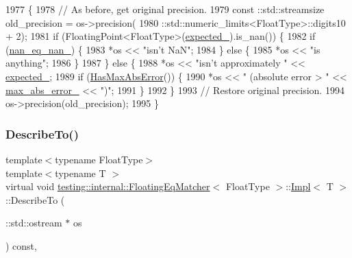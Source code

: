 \begin{DoxyCode}
1977                                                           \{
1978       \textcolor{comment}{// As before, get original precision.}
1979       const ::std::streamsize old\_precision = os->precision(
1980           ::std::numeric\_limits<FloatType>::digits10 + 2);
1981       \textcolor{keywordflow}{if} (FloatingPoint<FloatType>(\hyperlink{classtesting_1_1internal_1_1FloatingEqMatcher_1_1Impl_ab7d6c6eed79e4bd83fc3758bb53395eb}{expected\_}).is\_nan()) \{
1982         \textcolor{keywordflow}{if} (\hyperlink{classtesting_1_1internal_1_1FloatingEqMatcher_1_1Impl_a77073561281e81e81ac8c870a0689e7a}{nan\_eq\_nan\_}) \{
1983           *os << \textcolor{stringliteral}{"isn't NaN"};
1984         \} \textcolor{keywordflow}{else} \{
1985           *os << \textcolor{stringliteral}{"is anything"};
1986         \}
1987       \} \textcolor{keywordflow}{else} \{
1988         *os << \textcolor{stringliteral}{"isn't approximately "} << \hyperlink{classtesting_1_1internal_1_1FloatingEqMatcher_1_1Impl_ab7d6c6eed79e4bd83fc3758bb53395eb}{expected\_};
1989         \textcolor{keywordflow}{if} (\hyperlink{classtesting_1_1internal_1_1FloatingEqMatcher_1_1Impl_a3e3539f59004154b8af47a87a83a2d59}{HasMaxAbsError}()) \{
1990           *os << \textcolor{stringliteral}{" (absolute error > "} << \hyperlink{classtesting_1_1internal_1_1FloatingEqMatcher_1_1Impl_afec03a9fc571d9907979f088ff5e55e5}{max\_abs\_error\_} << \textcolor{stringliteral}{")"};
1991         \}
1992       \}
1993       \textcolor{comment}{// Restore original precision.}
1994       os->precision(old\_precision);
1995     \}
\end{DoxyCode}
\mbox{\label{classtesting_1_1internal_1_1FloatingEqMatcher_1_1Impl_aab6dbbe39ef8337e4686ae0f8c81a2c3}} 
\subsubsection{\texorpdfstring{Describe\+To()}{DescribeTo()}}
{\footnotesize\ttfamily template$<$typename Float\+Type$>$ \\
template$<$typename T $>$ \\
virtual void \hyperlink{classtesting_1_1internal_1_1FloatingEqMatcher}{testing\+::internal\+::\+Floating\+Eq\+Matcher}$<$ Float\+Type $>$\+::\hyperlink{classtesting_1_1internal_1_1FloatingEqMatcher_1_1Impl}{Impl}$<$ T $>$\+::Describe\+To (\begin{DoxyParamCaption}\item[{\+::std\+::ostream $\ast$}]{os }\end{DoxyParamCaption}) const\hspace{0.3cm}{\ttfamily [inline]}, {\ttfamily [virtual]}}



